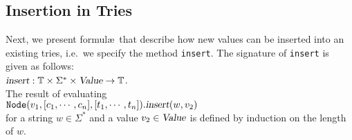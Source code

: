 \subsection{Insertion in Tries}
Next, we present formul\ae\ that describe how new values can be inserted into an existing tries,
i.e.~we specify the method \texttt{insert}.  The signature of \texttt{insert} is given as follows:
\\[0.2cm]
\hspace*{1.3cm}
$\textsl{insert}: \mathbb{T} \times \Sigma^* \times \textsl{Value} \rightarrow \mathbb{T}$.
\\[0.2cm]
The result of evaluating \\[0.2cm]
\hspace*{1.3cm} 
$\texttt{Node}(v_1, [c_1, \cdots, c_n], [t_1, \cdots, t_n]).\textsl{insert}(w, v_2)$
\\[0.2cm]
for a string $w\in \Sigma^*$ and a value $v_2 \in \textsl{Value}$ is defined by induction on the
length of $w$.
